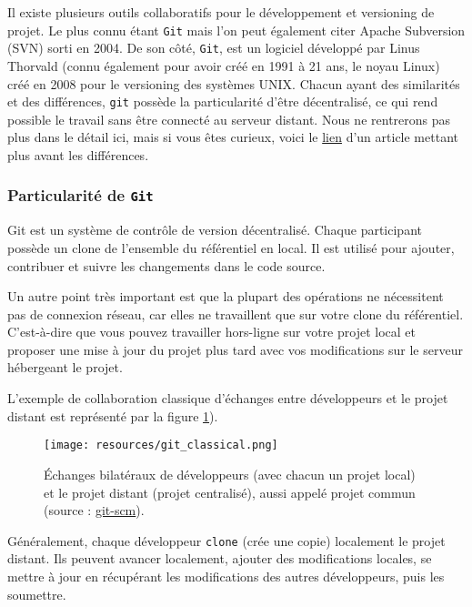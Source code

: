 \documentclass[11pt,a4paper,oneside]{article}
\begin{document}
Il existe plusieurs outils collaboratifs pour le développement et versioning de projet. Le plus connu étant \texttt{Git} mais l'on peut également citer Apache Subversion (SVN) sorti en 2004. De son côté, \texttt{Git}, est un logiciel développé par Linus Thorvald (connu également pour avoir créé en 1991 à 21 ans, le noyau Linux) créé en 2008 pour le versioning des systèmes UNIX. Chacun ayant des similarités et des différences, \texttt{git} possède la particularité d'être décentralisé, ce qui rend possible le travail sans être connecté au serveur distant. Nous ne rentrerons pas plus dans le détail ici, mais si vous êtes curieux, voici le \href{https://waytolearnx.com/2019/03/difference-entre-git-et-svn.html}{lien} d'un article mettant plus avant les différences.

\subsubsection{Particularité de \texttt{Git}}

Git est un système de contrôle de version décentralisé. Chaque participant possède un clone de l’ensemble du référentiel en local. Il est utilisé pour ajouter, contribuer et suivre les changements dans le code source.

\vspace{2mm}
Un autre point très important est que la plupart des opérations ne nécessitent pas de connexion réseau, car elles ne travaillent que sur votre clone du référentiel. C'est-à-dire que vous pouvez travailler hors-ligne sur votre projet local et proposer une mise à jour du projet plus tard avec vos modifications sur le serveur hébergeant le projet.

\vspace{2mm}
L'exemple de collaboration classique d'échanges entre développeurs et le projet distant est représenté par la figure \ref{fig:git_classical}).

\begin{figure}[ht]
	\centering
	\texttt{[image: resources/git\_classical.png]}
	
	\caption{Échanges bilatéraux de développeurs (avec chacun un projet local) et le projet distant (projet centralisé), aussi appelé projet commun (source : \href{https://git-scm.com/about/distributed}{git-scm}).}
	\label{fig:git_classical}
\end{figure}

Généralement, chaque développeur \texttt{clone} (crée une copie) localement le projet distant. Ils peuvent avancer localement, ajouter des modifications locales,  se mettre à jour en récupérant les modifications des autres développeurs, puis les soumettre.
\end{document}
